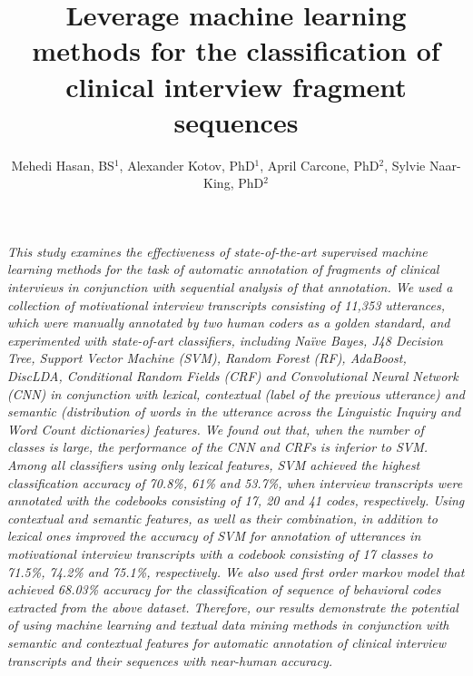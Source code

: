 \documentclass{amia}
\begin{document}
\title{Leverage machine learning methods for the classification of clinical interview fragment sequences}

\author{Mehedi Hasan, BS$^{1}$, Alexander Kotov, PhD$^{1}$, April Carcone, PhD$^{2}$, Sylvie Naar-King, PhD$^{2}$}


\maketitle

\textit{This study examines the effectiveness of state-of-the-art supervised machine learning methods for the task of automatic annotation of fragments of clinical interviews in conjunction with sequential analysis of that annotation. We used a collection of motivational interview transcripts consisting of 11,353 utterances, which were manually annotated by two human coders as a golden standard, and experimented with state-of-art classifiers, including Na\"{i}ve Bayes, J48 Decision Tree, Support Vector Machine (SVM), Random Forest (RF), AdaBoost, DiscLDA, Conditional Random Fields (CRF) and Convolutional Neural Network (CNN) in conjunction with lexical, contextual (label of the previous utterance) and semantic (distribution of words in the utterance across the Linguistic Inquiry and Word Count dictionaries) features. We found out that, when the number of classes is large, the performance of the CNN and CRFs is inferior to SVM. Among all classifiers using only lexical features, SVM achieved the highest classification accuracy of 70.8\%, 61\% and 53.7\%, when interview transcripts were annotated with the codebooks consisting of 17, 20 and 41 codes, respectively. Using contextual and semantic features, as well as their combination, in addition to lexical ones improved the accuracy of SVM for annotation of utterances in motivational interview transcripts with a codebook consisting of 17 classes to 71.5\%, 74.2\% and 75.1\%, respectively. We also used first order markov model that achieved 68.03\% accuracy for the classification of sequence of behavioral codes extracted from the above dataset. Therefore, our results demonstrate the potential of using machine learning  and textual data mining methods in conjunction with semantic and contextual features for automatic annotation of clinical interview transcripts  and their sequences with near-human accuracy.}
\end{document}
